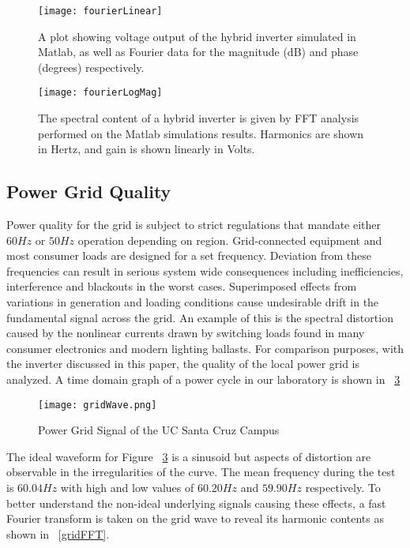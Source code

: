 \begin{figure}
\centering
\texttt{[image: fourierLinear]}
\caption{A plot showing voltage output of the hybrid inverter simulated in Matlab, as well as Fourier data for the magnitude (dB) and phase (degrees) respectively.}
\label{fourierLinear}
\end{figure}

\begin{figure}
\centering
\texttt{[image: fourierLogMag]}
\caption{The spectral content of a hybrid inverter is given by FFT analysis performed on the Matlab simulations results. Harmonics are shown in Hertz, and gain is shown linearly in Volts.}
\label{fourierLogMag}
\end{figure}

\subsection{Power Grid Quality}
Power quality for the grid is subject to strict regulations that mandate either $60 Hz$ or $50 Hz$ operation depending on region. Grid-connected equipment and most consumer loads are designed for a set frequency. Deviation from these frequencies can result in serious system wide consequences including inefficiencies, interference and blackouts in the worst cases. Superimposed effects from variations in generation and loading conditions cause undesirable drift in the fundamental signal across the grid. An example of this is the spectral distortion caused by the nonlinear currents drawn by switching loads found in many consumer electronics and modern lighting ballasts. For comparison purposes, with the inverter discussed in this paper, the quality of the local power grid is analyzed. A time domain graph of a power cycle in our laboratory is shown in ~\ref{gridWave} 

\begin{figure}
\centering
\texttt{[image: gridWave.png]}
\caption{Power Grid Signal of the UC Santa Cruz Campus}
\label{gridWave}
\end{figure}

The ideal waveform for Figure ~\ref{gridWave} is a sinusoid but aspects of distortion are observable in the irregularities of the curve. The mean frequency during the test is $60.04 Hz$ with high and low values of $60.20 Hz$ and $59.90 Hz$ respectively. To better understand the non-ideal underlying signals causing these effects, a fast Fourier transform is taken on the grid wave to reveal its harmonic contents as shown in ~\ref{gridFFT}.

